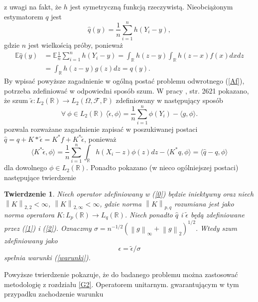 \documentclass[man,mfiu]{mgrwms}
\newcommand{\norm}[1]{\left\lVert#1\right\rVert}
\newtheorem{tw}{Twierdzenie}[chapter]
\begin{document}
z uwagi na fakt, że $h$ jest symetryczną funkcją rzeczywistą. Nieobciążonym estymatorem $q$ jest
\begin{equation}\label{1}
\hat{q}(y)=\frac{1}{n}\sum_{i=1}^nh\left(Y_i-y\right),
\end{equation}
gdzie $n$ jest wielkością próby, ponieważ
\begin{displaymath}
\begin{split}
\mathbb{E}\hat{q}(y)&=\mathbb{E}\frac{1}{n}\sum_{i=1}^nh\left(Y_i-y\right)=\int_{\mathbb{R}}h(z-y)\int_{\mathbb{R}}h(z -x)f(x)dxdz\\
&=\int_{\mathbb{R}}h(z-y)g(z)dz = q(y).
\end{split}
\end{displaymath} 
By wpisać powyższe zagadnienie w ogólną postać problemu odwrotnego (\ref{Af}), potrzeba zdefiniować w odpowiedni sposób szum. W pracy \cite{bissantz}, str. 2621 pokazano, że szum $\tilde{\epsilon}\colon L_2(\mathbb{R})\to L_2(\Omega,\mathcal{F},\mathbb{P})$ zdefiniowany w następujący sposób 
\begin{equation}\label{2}
\forall\ \phi\in L_2(\mathbb{R})\ \langle \tilde{\epsilon},\phi \rangle=\frac{1}{n}\sum_{i=1}^n\phi(Y_i)-\langle g,\phi\rangle.
\end{equation}
pozwala rozważane zagadnienie zapisać w poszukiwanej postaci $\hat{q}= q+ K*\tilde{\epsilon}=K^*f +K^*\tilde{\epsilon}$, ponieważ
\begin{displaymath}
\langle K^*\tilde{\epsilon},\phi\rangle = \frac{1}{n}\sum_{i=1}^n\int_{\mathbb{R}}h(X_i-z)\phi(z)dz-\langle K^*q,\phi\rangle = \langle \hat{q}-q,\phi\rangle
\end{displaymath}
dla dowolnego $\phi \in L_2(\mathbb{R})$. Ponadto pokazano (w nieco ogólniejszej postaci) następujące twierdzenie
\begin{tw}
Niech operator zdefiniowany w (\ref{0}) będzie iniektywny oraz niech $\norm{K}_{2,2}<\infty$, $\norm{K}_{2,\infty}<\infty$, gdzie norma $\norm{K}_{p,q}$ rozumiana jest jako norma operatora $K\colon L_p(\mathbb{R})\to L_q(\mathbb{R})$. Niech ponadto $\hat{q}$ i $\tilde{\epsilon}$ będą zdefiniowane przez (\ref{1}) i (\ref{2}). Oznaczmy $\sigma=n^{-1/2}\left(\norm{g}_{\infty}+\norm{g}_2\right)^{1/2}$. Wtedy szum zdefiniowany jako
\begin{displaymath}
\epsilon=\tilde{\epsilon}/\sigma
\end{displaymath}
spełnia warunki (\ref{warunki}).
\end{tw}
Powyższe twierdzenie pokazuje, że do badanego problemu można zastosować metodologię z rozdziału \ref{G2}. Operatorem unitarnym. gwarantującym w tym przypadku zachodzenie warunku 
\end{document}
